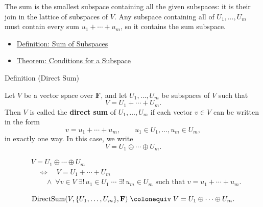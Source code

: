 \begin{remark*}[Interpretation]
The sum is the smallest subspace containing all the given subspaces: it is
their join in the lattice of subspaces of $V$. Any subspace containing all
of $U_1,\ldots,U_m$ must contain every sum $u_1+\cdots+u_m$, so it
contains the sum subspace.
\end{remark*}

\begin{dependencies}
\begin{itemize}
  \item \hyperref[def:sum-of-subspaces]{Definition: Sum of Subspaces}
  \item \hyperref[thm:conditions-for-a-subspace]{Theorem: Conditions for a Subspace}
\end{itemize}
\end{dependencies}


\begin{definitionbox}{Definition (Direct Sum)}
\begin{definition}
\label{def:direct-sum}
Let $V$ be a vector space over $\mathbf{F}$, and let
$U_1,\dots,U_m$ be subspaces of $V$ such that
\[
V=U_1+\cdots+U_m.
\]
Then $V$ is called the \textbf{direct sum} of $U_1,\dots,U_m$ if each
vector $v \in V$ can be written in the form
\[
v=u_1+\cdots+u_m,
\qquad
u_1 \in U_1,\dots,u_m \in U_m,
\]
in exactly one way.
In this case, we write
\[
V=U_1\oplus\cdots\oplus U_m.
\]
\end{definition}
\end{definitionbox}

\begin{remark*}
\[
\begin{aligned}
&V=U_1\oplus\cdots\oplus U_m \\
&\quad\Longleftrightarrow\quad
V=U_1+\cdots+U_m \\
&\qquad\land\;
\forall v \in V\;
\exists!\, u_1 \in U_1 \;\cdots\; \exists!\, u_m \in U_m
\text{ such that } v=u_1+\cdots+u_m.
\end{aligned}
\]
\end{remark*}

\begin{remark*}
\[
\operatorname{DirectSum}(V,\{U_1,\dots,U_m\},\mathbf{F})
\;\colonequiv\;
V=U_1\oplus\cdots\oplus U_m.
\]
\end{remark*}

